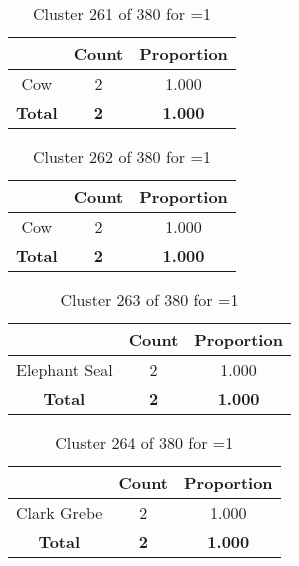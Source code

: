 \begin{table}[ht!]
\centering
\begin{tabular}{|c|c|c|}
\hline
\bf \Spec{} &\bf Count &\bf Proportion\\ \hline \hline
Cow & 2 & 1.000\\ \hline
\hline
\bf Total & \bf 2 & \bf 1.000\\ \hline
\end{tabular}
\label{tab:cluster:261:1}
\caption{Cluster 261 of 380 for \minneigh{}=1}
\end{table}

\begin{table}[ht!]
\centering
\begin{tabular}{|c|c|c|}
\hline
\bf \Spec{} &\bf Count &\bf Proportion\\ \hline \hline
Cow & 2 & 1.000\\ \hline
\hline
\bf Total & \bf 2 & \bf 1.000\\ \hline
\end{tabular}
\label{tab:cluster:262:1}
\caption{Cluster 262 of 380 for \minneigh{}=1}
\end{table}

\begin{table}[ht!]
\centering
\begin{tabular}{|c|c|c|}
\hline
\bf \Spec{} &\bf Count &\bf Proportion\\ \hline \hline
Elephant Seal & 2 & 1.000\\ \hline
\hline
\bf Total & \bf 2 & \bf 1.000\\ \hline
\end{tabular}
\label{tab:cluster:263:1}
\caption{Cluster 263 of 380 for \minneigh{}=1}
\end{table}

\begin{table}[ht!]
\centering
\begin{tabular}{|c|c|c|}
\hline
\bf \Spec{} &\bf Count &\bf Proportion\\ \hline \hline
Clark Grebe & 2 & 1.000\\ \hline
\hline
\bf Total & \bf 2 & \bf 1.000\\ \hline
\end{tabular}
\label{tab:cluster:264:1}
\caption{Cluster 264 of 380 for \minneigh{}=1}
\end{table}

